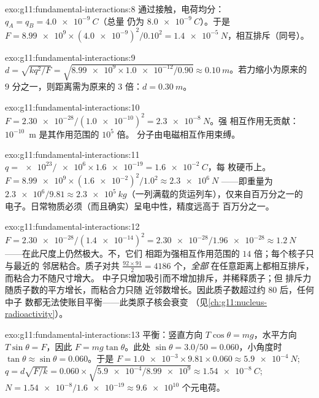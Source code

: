 \begin{solution}{exo:g11:fundamental-interactions:8}
通过接触，电荷均分：$q_A = q_B = \qty{+4.0e-9}{C}$（总量
仍为 $\qty{8.0e-9}{C}$）。于是
$F = \num{8.99e9} \times (\num{4.0e-9})^2/0.10^2 =
\qty{1.4e-5}{N}$，相互排斥（同号）。
\end{solution}

\begin{solution}{exo:g11:fundamental-interactions:9}
$d = \sqrt{k q^2/F} = \sqrt{\num{8.99e9} \times \num{1.0e-12}/0.90}
\approx \qty{0.10}{m}$。若力缩小为原来的 $9$ 分之一，则距离需为原来的 $3$
倍：$d = \qty{0.30}{m}$。
\end{solution}

\begin{solution}{exo:g11:fundamental-interactions:10}
$F = \num{2.30e-28}/(\num{1.0e-10})^2 = \qty{2.3e-8}{N}$。强
相互作用无贡献：$10^{-10}$~m 是其作用范围的 $10^{5}$ 倍。
分子由电磁相互作用束缚。
\end{solution}

\begin{solution}{exo:g11:fundamental-interactions:11}
$q = \num{e23}/\num{e6} \times \num{1.6e-19} = \qty{1.6e-2}{C}$，每
枚硬币上。$F = \num{8.99e9} \times (\num{1.6e-2})^2/1.0^2 \approx
\qty{2.3e6}{N}$ ——即重量为 $\num{2.3e6}/9.81 \approx
\qty{2.3e5}{kg}$（一列满载的货运列车），仅来自百万分之一的
电子。日常物质必须（而且确实）呈电中性，精度远高于
百万分之一。
\end{solution}

\begin{solution}{exo:g11:fundamental-interactions:12}
$F = \num{2.30e-28}/(\num{1.4e-14})^2 = \num{2.30e-28}/\num{1.96e-28}
\approx \qty{1.2}{N}$ ——在此尺度上仍然极大。不，它们
相距为强相互作用范围的 $14$ 倍；每个核子只与最近的
邻居粘合。质子对共 $\frac{92 \times 91}{2} = 4186$ 个，\emph{全部}
在任意距离上都相互排斥，而粘合力不随尺寸增大。
中子只增加吸引而不增加排斥，并稀释质子；但
排斥力随质子数的平方增长，而粘合力只随
近邻数增长。因此质子数超过约 $80$ 后，任何中子
数都无法使账目平衡——此类原子核会衰变
（见\cref{ch:g11:nucleus-radioactivity}）。
\end{solution}

\begin{solution}{exo:g11:fundamental-interactions:13}
平衡：竖直方向 $T\cos\theta = mg$，水平方向
$T\sin\theta = F$，因此 $F = mg\tan\theta$。此处
$\sin\theta = 3.0/50 = 0.060$，小角度时
$\tan\theta \approx \sin\theta = 0.060$。于是
$F = \num{1.0e-3} \times 9.81 \times 0.060 \approx \qty{5.9e-4}{N}$;
$q = d\sqrt{F/k} = 0.060 \times \sqrt{\num{5.9e-4}/\num{8.99e9}}
\approx \qty{1.54e-8}{C}$; $N = \num{1.54e-8}/\num{1.6e-19} \approx
\num{9.6e10}$ 个元电荷。
\end{solution}

